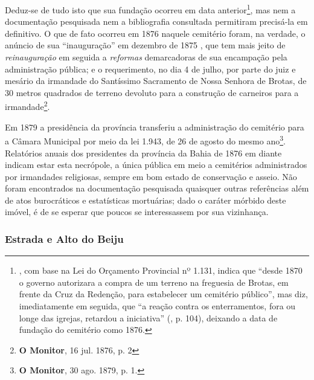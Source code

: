 Deduz-se de tudo isto que sua fundação ocorreu em data anterior\footnote{, com base na Lei do Orçamento Provincial nº 1.131, indica que ``desde 1870 o governo autorizara a compra de um terreno na freguesia de Brotas, em frente da Cruz da Redenção, para estabelecer um cemitério público'', mas diz, imediatamente em seguida, que ``a reação contra os enterramentos, fora ou longe das igrejas, retardou a iniciativa'' (\citeyear{flexor_desenho_1999}, p. 104), deixando a data de fundação do cemitério como 1876.}, mas nem a documentação pesquisada nem a bibliografia consultada permitiram precisá-la em definitivo. O que de fato ocorreu em 1876 naquele cemitério foram, na verdade, o anúncio de sua ``inauguração'' em dezembro de 1875 \cite[p.~54]{bahia_rpe_1876}, que tem mais jeito de \textit{reinauguração} em seguida a \textit{reformas} demarcadoras de sua encampação pela administração pública; e o requerimento, no dia 4 de julho, por parte do juiz e mesário da irmandade do Santíssimo Sacramento de Nossa Senhora de Brotas, de 30 metros quadrados de terreno devoluto para a construção de carneiros para a irmandade\footnote{\textbf{O Monitor}, 16 jul. 1876, p. 2}. 

Em 1879 a presidência da província transferiu a administração do cemitério para a Câmara Municipal por meio da lei 1.943, de 26 de agosto do mesmo ano\footnote{\textbf{O Monitor}, 30 ago. 1879, p. 1.}. Relatórios anuais dos presidentes da província da Bahia de 1876 em diante indicam estar esta necrópole, a única pública em meio a cemitérios administrados por irmandades religiosas, sempre em bom estado de conservação e asseio. Não foram encontrados na documentação pesquisada quaisquer outras referências além de atos burocráticos e estatísticas mortuárias; dado o caráter mórbido deste imóvel, é de se esperar que poucos se interessassem por sua vizinhança.

\subsubsection{Estrada e Alto do Beiju}\label{subsubsec:estrbeiju}

